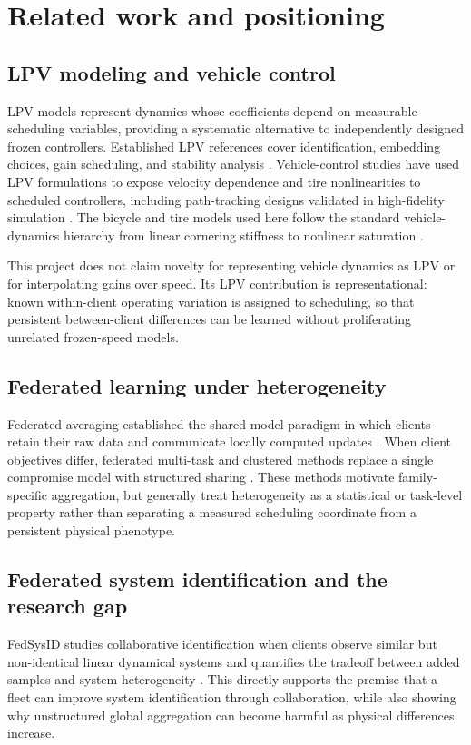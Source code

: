 \section{Related work and positioning}
\label{sec:related-work}

\subsection{LPV modeling and vehicle control}
LPV models represent dynamics whose coefficients depend on measurable scheduling
variables, providing a systematic alternative to independently designed frozen
controllers. Established LPV references cover identification, embedding choices,
gain scheduling, and stability analysis
\cite{toth2010lpv,apkarian1995selfscheduled,hoffmann2015survey}. Vehicle-control
studies have used LPV formulations to expose velocity dependence and tire
nonlinearities to scheduled controllers, including path-tracking designs validated
in high-fidelity simulation \cite{corno2021lpv,gimondi2021lpv}. The bicycle and
tire models used here follow the standard vehicle-dynamics hierarchy from linear
cornering stiffness to nonlinear saturation \cite{pacejka2012tire}.

This project does not claim novelty for representing vehicle dynamics as LPV or
for interpolating gains over speed. Its LPV contribution is representational:
known within-client operating variation is assigned to scheduling, so that
persistent between-client differences can be learned without proliferating
unrelated frozen-speed models.

\subsection{Federated learning under heterogeneity}
Federated averaging established the shared-model paradigm in which clients retain
their raw data and communicate locally computed updates \cite{mcmahan2017fedavg}.
When client objectives differ, federated multi-task and clustered methods replace
a single compromise model with structured sharing
\cite{smith2017federated,ghosh2020ifca,sattler2021clustered}. These methods motivate
family-specific aggregation, but generally treat heterogeneity as a statistical
or task-level property rather than separating a measured scheduling coordinate
from a persistent physical phenotype.

\subsection{Federated system identification and the research gap}
FedSysID studies collaborative identification when clients observe similar but
non-identical linear dynamical systems and quantifies the tradeoff between added
samples and system heterogeneity \cite{wang2023fedsysid}. This directly supports
the premise that a fleet can improve system identification through collaboration,
while also showing why unstructured global aggregation can become harmful as
physical differences increase.

